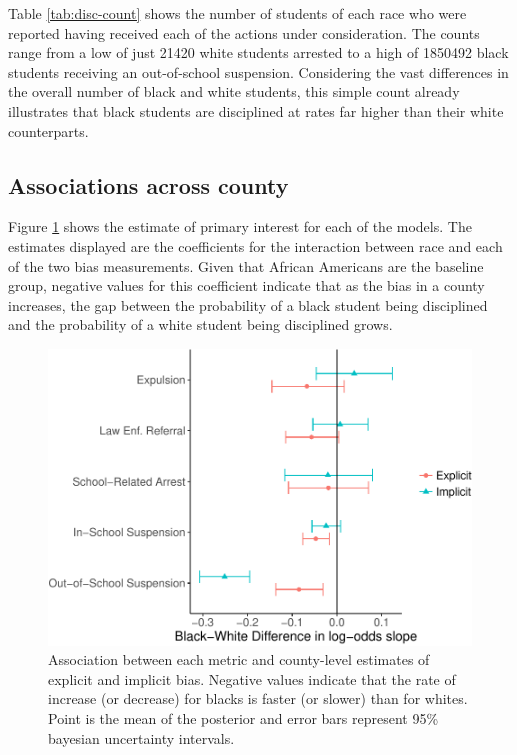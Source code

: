 \documentclass[english,floatsintext,man]{apa6}
\theoremstyle{definition}
\theoremstyle{definition}
\theoremstyle{remark}
\begin{document}
Table \ref{tab:disc-count} shows the number of students of each race who
were reported having received each of the actions under consideration.
The counts range from a low of just 21420 white students arrested to a
high of 1850492 black students receiving an out-of-school suspension.
Considering the vast differences in the overall number of black and
white students, this simple count already illustrates that black
students are disciplined at rates far higher than their white
counterparts.

\subsection{Associations across
county}\label{associations-across-county}

Figure \ref{fig:overall-associations} shows the estimate of primary
interest for each of the models. The estimates displayed are the
coefficients for the interaction between race and each of the two bias
measurements. Given that African Americans are the baseline group,
negative values for this coefficient indicate that as the bias in a
county increases, the gap between the probability of a black student
being disciplined and the probability of a white student being
disciplined grows.

\begin{figure}
\centering
\includegraphics{draft_files/figure-latex/overall-associations-1.pdf}
\caption{\label{fig:overall-associations}Association between each metric and
county-level estimates of explicit and implicit bias. Negative values
indicate that the rate of increase (or decrease) for blacks is faster
(or slower) than for whites. Point is the mean of the posterior and
error bars represent 95\% bayesian uncertainty intervals.}
\end{figure}
\end{document}
